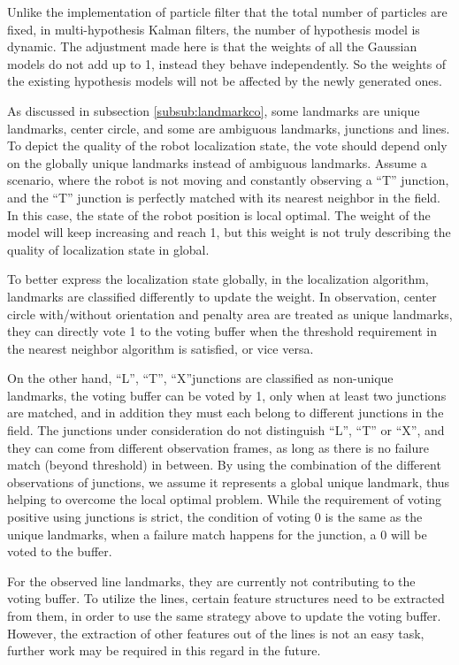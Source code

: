 Unlike the implementation of particle filter that the total number of particles are fixed, in multi-hypothesis Kalman filters, the number of hypothesis model is dynamic. The adjustment made here is that the weights of all the Gaussian models do not add up to 1, instead they behave independently. So the weights of the existing hypothesis models will not be affected by the newly generated ones.

As discussed in subsection \ref{subsub:landmarkco}, some landmarks are unique landmarks, \ie{} center circle, and some are ambiguous landmarks, \ie{} junctions and lines. To depict the quality of the robot localization state, the vote should depend only on the globally unique landmarks instead of ambiguous landmarks. Assume a scenario, where the robot is not moving and constantly observing a ``T'' junction, and the ``T'' junction is perfectly matched with its nearest neighbor in the field. In this case, the state of the robot position is local optimal. The weight of the model will keep increasing and reach 1, but this weight is not truly describing the quality of localization state in global. 

To better express the localization state globally, in the localization algorithm, landmarks are classified differently to update the weight. In observation, center circle with/without orientation and penalty area are treated as unique landmarks, they can directly vote 1 to the voting buffer when the threshold requirement in the nearest neighbor algorithm is satisfied, or vice versa. 

On the other hand, ``L'', ``T'', ``X''junctions are classified as non-unique landmarks, the voting buffer can be voted by 1, only when at least two junctions are matched, and in addition they must each belong to different junctions in the field. The junctions under consideration do not distinguish ``L'', ``T'' or ``X'', and they can come from different observation frames, as long as there is no failure match (beyond threshold) in between. By using the combination of the different observations of junctions, we assume it represents a global unique landmark, thus helping to overcome the local optimal problem. While the requirement of voting positive using junctions is strict, the condition of voting 0 is the same as the unique landmarks, \ie{} when a failure match happens for the junction, a 0 will be voted to the buffer.  

For the observed line landmarks, they are currently not contributing to the voting buffer. To utilize the lines, certain feature structures need to be extracted from them, in order to use the same strategy above to update the voting buffer. However, the extraction of other features out of the lines is not an easy task, further work may be required in this regard in the future. 



